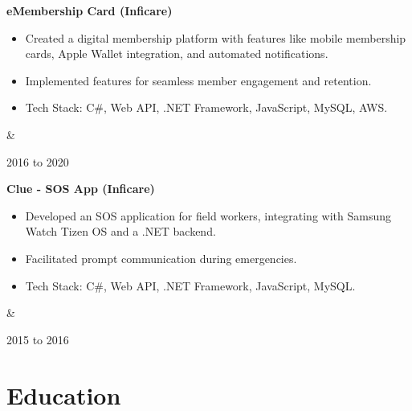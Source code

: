 \documentclass[10pt, letterpaper]{article}
\newenvironment{highlights}{
        \begin{itemize}[
                topsep=0pt,
                parsep=0.10cm,
                partopsep=0pt,
                itemsep=0pt,
                after=\vspace{-1\baselineskip},
                leftmargin=0.4cm + 3pt
            ]
    }{
        \end{itemize}
    } %
\let\originalTabularx\tabularx
\let\originalEndTabularx\endtabularx
\renewenvironment{tabularx}{\bgroup\centering\originalTabularx}{\originalEndTabularx\par\egroup}
\begin{document}
        \vspace{0.2cm}
        \begin{tabularx}{
            \textwidth-0.4 cm-0.13cm
        }{
            K{0.2cm}
            R{4.1cm}
        }
            \textbf{eMembership Card (Inficare)}

            \vspace{0.10cm}

            \begin{highlights}
                \item Created a digital membership platform with features like mobile membership cards, Apple Wallet integration, and automated notifications.
                \item Implemented features for seamless member engagement and retention.
                \item Tech Stack: C\#, Web API, .NET Framework, JavaScript, MySQL, AWS.
            \end{highlights}
            &
            

            2016 to 2020
        \end{tabularx}


        \vspace{0.2cm}
        \begin{tabularx}{
            \textwidth-0.4 cm-0.13cm
        }{
            K{0.2cm}
            R{4.1cm}
        }
            \textbf{Clue - SOS App (Inficare)}

            \vspace{0.10cm}

            \begin{highlights}
                \item Developed an SOS application for field workers, integrating with Samsung Watch Tizen OS and a .NET backend.
                \item Facilitated prompt communication during emergencies.
                \item Tech Stack: C\#, Web API, .NET Framework, JavaScript, MySQL.
            \end{highlights}
            &
            

            2015 to 2016
        \end{tabularx}



    
    \section{Education}
\end{document}
